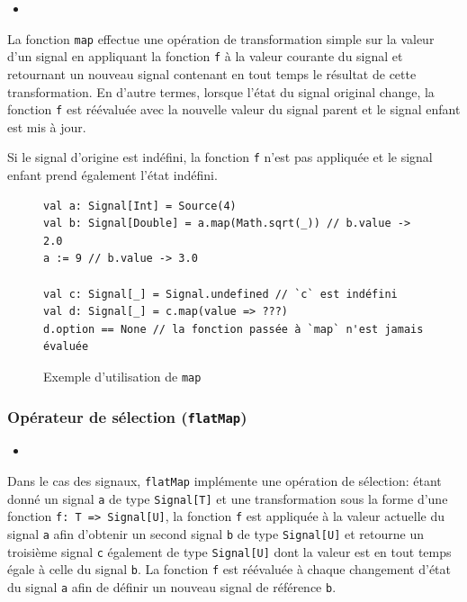 \begin{itemize}
	\item {}
\end{itemize}

La fonction \texttt{map} effectue une opération de transformation simple sur la valeur d'un signal en appliquant la fonction \texttt{f} à la valeur courante du signal et retournant un nouveau signal contenant en tout temps le résultat de cette transformation. En d'autre termes, lorsque l'état du signal original change, la fonction \texttt{f} est réévaluée avec la nouvelle valeur du signal parent et le signal enfant est mis à jour.

Si le signal d'origine est indéfini, la fonction \texttt{f} n'est pas appliquée et le signal enfant prend également l'état indéfini.

\begin{figure}[h]
	\begin{lstlisting}
val a: Signal[Int] = Source(4)
val b: Signal[Double] = a.map(Math.sqrt(_)) // b.value -> 2.0
a := 9 // b.value -> 3.0

val c: Signal[_] = Signal.undefined // `c` est indéfini
val d: Signal[_] = c.map(value => ???)
d.option == None // la fonction passée à `map` n'est jamais évaluée
	\end{lstlisting}
	\caption{Exemple d'utilisation de \texttt{map}}
\end{figure}

\subsubsection{Opérateur de sélection (\texttt{flatMap})}

\begin{itemize}
	\item {}
\end{itemize}

Dans le cas des signaux, \texttt{flatMap} implémente une opération de sélection: étant donné un signal \texttt{a} de type \texttt{Signal[T]} et une transformation sous la forme d'une fonction \texttt{f: T => Signal[U]}, la fonction \texttt{f} est appliquée à la valeur actuelle du signal \texttt{a} afin d'obtenir un second signal \texttt{b} de type \texttt{Signal[U]} et retourne un troisième signal \texttt{c} également de type \texttt{Signal[U]} dont la valeur est en tout temps égale à celle du signal \texttt{b}. La fonction \texttt{f} est réévaluée à chaque changement d'état du signal \texttt{a} afin de définir un nouveau signal de référence \texttt{b}.

